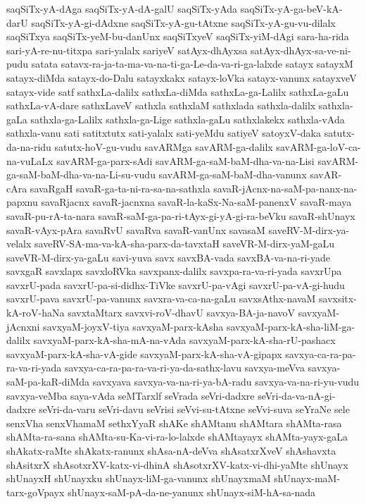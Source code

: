 {saqSiTx-yA-dAga
saqSiTx-yA-dA-galU
saqSiTx-yAda
saqSiTx-yA-ga-beV-kA-darU
saqSiTx-yA-gi-dAdxne
saqSiTx-yA-gu-tAtxne
saqSiTx-yA-gu-vu-dilalx
saqSiTxya
saqSiTx-yeM-bu-danUnx
saqSiTxyeV
saqSiTx-yiM-dAgi
sara-ha-rida
sari-yA-re-nu-titxpa
sari-yalalx
sariyeV
satAyx-dhAyxsa
satAyx-dhAyx-sa-ve-ni-pudu
satata
satavx-ra-ja-ta-ma-va-na-ti-ga-Le-da-va-ri-ga-lalxde
satayx
satayxM
satayx-diMda
satayx-do-Dalu
satayxkakx
satayx-loVka
satayx-vanunx
satayxveV
satayx-vide
satf
sathxLa-dalilx
sathxLa-diMda
sathxLa-ga-Lalilx
sathxLa-gaLu
sathxLa-vA-dare
sathxLaveV
sathxla
sathxlaM
sathxlada
sathxla-dalilx
sathxla-gaLa
sathxla-ga-Lalilx
sathxla-ga-Lige
sathxla-gaLu
sathxlakekx
sathxla-vAda
sathxla-vanu
sati
satitxtutx
sati-yalalx
sati-yeMdu
satiyeV
satoyxV-daka
satutx-da-na-ridu
satutx-hoV-gu-vudu
savARMga
savARM-ga-dalilx
savARM-ga-loV-ca-na-vuLaLx
savARM-ga-parx-sAdi
savARM-ga-saM-baM-dha-va-na-Lisi
savARM-ga-saM-baM-dha-va-na-Li-su-vudu
savARM-ga-saM-baM-dha-vanunx
savAR-cAra
savaRgaH
savaR-ga-ta-ni-ra-sa-na-sathxla
savaR-jAcnx-na-saM-pa-nanx-na-papxnu
savaRjacnx
savaR-jacnxna
savaR-la-kaSx-Na-saM-panenxV
savaR-maya
savaR-pu-rA-ta-nara
savaR-saM-ga-pa-ri-tAyx-gi-yA-gi-ra-beVku
savaR-shUnayx
savaR-vAyx-pAra
savaRvU
savaRva
savaR-vanUnx
savasaM
saveRV-M-dirx-ya-velalx
saveRV-SA-ma-va-kA-sha-parx-da-tavxtaH
saveVR-M-dirx-yaM-gaLu
saveVR-M-dirx-ya-gaLu
savi-yuva
savx
savxBA-vada
savxBA-va-na-ri-yade
savxgaR
savxlapx
savxloRVka
savxpanx-dalilx
savxpa-ra-va-ri-yada
savxrUpa
savxrU-pada
savxrU-pa-si-didhx-TiVke
savxrU-pa-vAgi
savxrU-pa-vA-gi-hudu
savxrU-pava
savxrU-pa-vanunx
savxra-va-ca-na-gaLu
savxsAthx-navaM
savxsitx-kA-roV-haNa
savxtaMtarx
savxvi-roV-dhavU
savxya-BA-ja-navoV
savxyaM-jAcnxni
savxyaM-joyxV-tiya
savxyaM-parx-kAsha
savxyaM-parx-kA-sha-liM-ga-dalilx
savxyaM-parx-kA-sha-mA-na-vAda
savxyaM-parx-kA-sha-rU-pashacx
savxyaM-parx-kA-sha-vA-gide
savxyaM-parx-kA-sha-vA-gipapx
savxya-ca-ra-pa-ra-va-ri-yada
savxya-ca-ra-pa-ra-va-ri-ya-da-sathx-lavu
savxya-meVva
savxya-saM-pa-kaR-diMda
savxyava
savxya-va-na-ri-ya-bA-radu
savxya-va-na-ri-yu-vudu
savxya-veMba
saya-vAda
seMTarxlf
seVrada
seVri-dadxre
seVri-da-va-nA-gi-dadxre
seVri-da-varu
seVri-davu
seVrisi
seVvi-su-tAtxne
seVvi-suva
seYraNe
sele
senxVha
senxVhamaM
sethxYyaR
shAKe
shAMtanu
shAMtara
shAMta-rasa
shAMta-ra-sana
shAMta-su-Ka-vi-ra-lo-lalxde
shAMtayayx
shAMta-yayx-gaLa
shAkatx-raMte
shAkatx-ranunx
shAsa-nA-deVva
shAsatxrXveV
shAshavxta
shAsitxrX
shAsotxrXV-katx-vi-dhinA
shAsotxrXV-katx-vi-dhi-yaMte
shUnayx
shUnayxH
shUnayxku
shUnayx-liM-ga-vanunx
shUnayxmaM
shUnayx-maM-tarx-goVpayx
shUnayx-saM-pA-da-ne-yanunx
shUnayx-siM-hA-sa-nada
}
